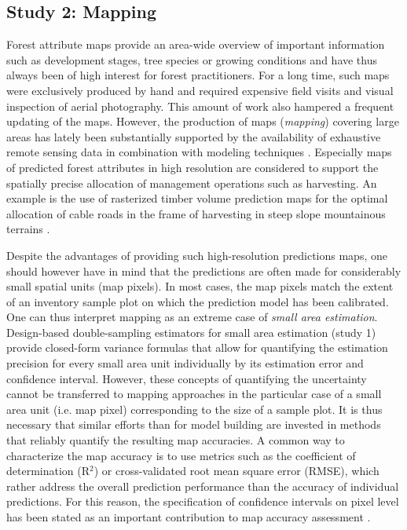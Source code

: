 \subsection{Study 2: Mapping} %
\label{sec:study2}


Forest attribute maps provide an area-wide overview of important information such as development stages, tree species or growing conditions and have thus always been of high interest for forest practitioners. For a long time, such maps were exclusively produced by hand and required expensive field visits and visual inspection of aerial photography. This amount of work also hampered a frequent updating of the maps. However, the production of maps (\textit{mapping}) covering large areas has lately been substantially supported by the availability of exhaustive remote sensing data in combination with modeling techniques \citep{brosofske2014}. Especially maps of predicted forest attributes in high resolution are considered to support the spatially precise allocation of management operations such as harvesting. An example is the use of rasterized timber volume prediction maps for the optimal allocation of cable roads in the frame of harvesting in steep slope mountainous terrains \citep{bont2012, bont2015}.\par

Despite the advantages of providing such high-resolution predictions maps, one should however have in mind that the predictions are often made for considerably small spatial units (map pixels). In most cases, the map pixels match the extent of an inventory sample plot on which the prediction model has been calibrated. One can thus interpret mapping as an extreme case of \textit{small area estimation}. Design-based double-sampling estimators for small area estimation (study 1) provide closed-form variance formulas that allow for quantifying the estimation precision for every small area unit individually by its estimation error and confidence interval. However, these concepts of quantifying the uncertainty cannot be transferred to mapping approaches in the particular case of a small area unit (i.e. map pixel) corresponding to the size of a sample plot. It is thus necessary that similar efforts than for model building are invested in methods that reliably quantify the resulting map accuracies. A common way to characterize the map accuracy is to use metrics such as the coefficient of determination (R$^2$) or cross-validated root mean square error (RMSE), which rather address the overall prediction performance than the accuracy of individual predictions. For this reason, the specification of confidence intervals on pixel level has been stated as an important contribution to map accuracy assessment \citep{mcroberts2010a}.\par

